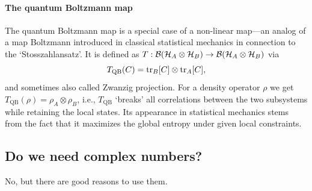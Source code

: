 \documentclass[11pt,a4paper]{article}
\theoremstyle{plain}
\theoremstyle{definition}
\theoremstyle{remark}
\numberwithin{equation}{section}
\begin{document}
\paragraph{The quantum Boltzmann map}
The quantum Boltzmann map is a special case of a non-linear map---an analog of a map Boltzmann introduced in classical statistical mechanics in connection to the `Stosszahlansatz'. It is defined as $T:\mathcal{B}(\mathcal{H}_A\otimes \mathcal{H}_B)\to \mathcal{B}(\mathcal{H}_A\otimes \mathcal{H}_B)$ via
\begin{equation}
    T_{\mathrm{QB}}(C)=\operatorname{tr}_B[C]\otimes \operatorname{tr}_A[C],
\end{equation}
and sometimes also called Zwanzig projection. For a density operator $\rho$ we get $T_{\mathrm{QB}}(\rho)=\rho_A\otimes \rho_B$, i.e., $T_{\mathrm{QB}}$ `breaks' all correlations between the two subsystems while retaining the local states. Its appearance in statistical mechanics stems from the fact that it maximizes the global entropy under given local constraints.

\subsection{Do we need complex numbers?}

No, but there are good reasons to use them.
\end{document}
